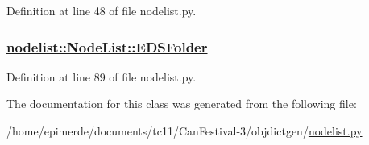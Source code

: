 Definition at line 48 of file nodelist.py.\hypertarget{classnodelist_1_1NodeList_85d003455c6b3c98bec4e8602acd3fe0}{
\subsubsection[EDSFolder]{\setlength{\rightskip}{0pt plus 5cm}\hyperlink{classnodelist_1_1NodeList_85d003455c6b3c98bec4e8602acd3fe0}{nodelist::Node\-List::EDSFolder}}}
\label{classnodelist_1_1NodeList_85d003455c6b3c98bec4e8602acd3fe0}




Definition at line 89 of file nodelist.py.

The documentation for this class was generated from the following file:\begin{CompactItemize}
\item 
/home/epimerde/documents/tc11/Can\-Festival-3/objdictgen/\hyperlink{nodelist_8py}{nodelist.py}\end{CompactItemize}
